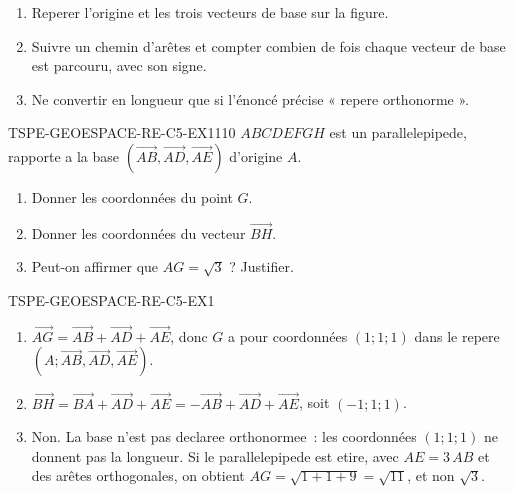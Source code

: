 \begin{enumerate}
  \item Reperer l'origine et les trois vecteurs de base sur la figure.
  \item Suivre un chemin d'arêtes et compter combien de fois chaque vecteur de
        base est parcouru, avec son signe.
  \item Ne convertir en longueur que si l'énoncé précise « repere orthonorme ».
\end{enumerate}


\begin{exercice}{TSPE-GEOESPACE-RE-C5-EX1}{1}{10}
$ABCDEFGH$ est un parallelepipede, rapporte a la base
$(\vec{AB},\vec{AD},\vec{AE})$ d'origine $A$.
\begin{enumerate}
  \item Donner les coordonnées du point $G$.
  \item Donner les coordonnées du vecteur $\vec{BH}$.
  \item Peut-on affirmer que $AG=\sqrt{3}$ ? Justifier.
\end{enumerate}
\end{exercice}


\begin{corrige}{TSPE-GEOESPACE-RE-C5-EX1}
\begin{enumerate}
  \item $\vec{AG}=\vec{AB}+\vec{AD}+\vec{AE}$, donc $G$ a pour coordonnées
        $(1;1;1)$ dans le repere $(A;\vec{AB},\vec{AD},\vec{AE})$.
  \item $\vec{BH}=\vec{BA}+\vec{AD}+\vec{AE}=-\vec{AB}+\vec{AD}+\vec{AE}$,
        soit $(-1;1;1)$.
  \item Non. La base n'est pas declaree orthonormee~: les coordonnées
        $(1;1;1)$ ne donnent pas la longueur. Si le parallelepipede est
        etire, avec $AE=3\,AB$ et des arêtes orthogonales, on obtient
        $AG=\sqrt{1+1+9}=\sqrt{11}$, et non $\sqrt{3}$.
\end{enumerate}
\end{corrige}

